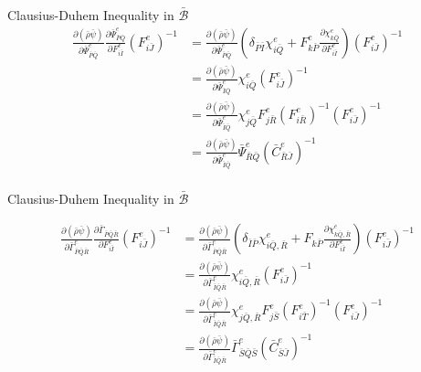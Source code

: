 \documentclass[11pt]{beamer}
\begin{document}
\begin{frame}{Clausius-Duhem Inequality in $\bar{\mathcal{B}}$}
\begin{align*}
\frac{\partial\left(\bar{\rho}\bar{\psi}\right)}{\partial \bar{\Psi}_{\bar{P}\bar{Q}}^e} \frac{\partial \bar{\Psi}_{\bar{P}\bar{Q}}^e}{\partial F_{i\bar{I}}^e} \left(F_{i\bar{J}}^e\right)^{-1} &= \frac{\partial\left(\bar{\rho}\bar{\psi}\right)}{\partial \bar{\Psi}_{\bar{P}\bar{Q}}^e}\left(\delta_{\bar{P}\bar{I}} \chi_{i\bar{Q}}^e + F_{k\bar{P}}^e \frac{\partial \chi_{k\bar{Q}}^e}{\partial F_{i\bar{I}}^e} \right)\left(F_{i\bar{J}}^e\right)^{-1}\\
&= \frac{\partial\left(\bar{\rho}\bar{\psi}\right)}{\partial \bar{\Psi}_{\bar{I}\bar{Q}}^e}\chi_{i\bar{Q}}^e\left(F_{i\bar{J}}^e\right)^{-1}\\& = \frac{\partial\left(\bar{\rho}\bar{\psi}\right)}{\partial \bar{\Psi}_{\bar{I}\bar{Q}}^e}\chi_{j\bar{Q}}^e F_{j\bar{R}}^e \left(F_{i\bar{R}}^e\right)^{-1} \left(F_{i\bar{J}}^e\right)^{-1}\\
&=  \frac{\partial\left(\bar{\rho}\bar{\psi}\right)}{\partial \bar{\Psi}_{\bar{I}\bar{Q}}^e}\bar{\Psi}_{\bar{R}\bar{Q}}^e \left(\bar{C}_{\bar{R}\bar{J}}^e\right)^{-1}\\
\end{align*}

\end{frame}

\begin{frame}{Clausius-Duhem Inequality in $\bar{\mathcal{B}}$}

\begin{align*}
\frac{\partial\left(\bar{\rho}\bar{\psi}\right)}{\partial \bar{\Gamma}_{\bar{P}\bar{Q}\bar{R}}^e} \frac{\partial \bar{\Gamma}_{\bar{P}\bar{Q}\bar{R}}}{\partial F_{i\bar{I}}^e}\left(F_{i\bar{J}}^e\right)^{-1} &= \frac{\partial\left(\bar{\rho}\bar{\psi}\right)}{\partial \bar{\Gamma}_{\bar{P}\bar{Q}\bar{R}}^e}\left(\delta_{\bar{I}\bar{P}} \chi_{i\bar{Q},\bar{R}}^e + F_{k\bar{P}} \frac{\partial \chi_{k\bar{Q},\bar{R}}^e}{\partial F_{i\bar{I}}^e}\right)\left(F_{i\bar{J}}^e\right)^{-1}\\
&= \frac{\partial\left(\bar{\rho}\bar{\psi}\right)}{\partial \bar{\Gamma}_{\bar{I}\bar{Q}\bar{R}}^e} \chi_{i\bar{Q},\bar{R}}^e \left(F_{i\bar{J}}^e\right)^{-1}\\
&= \frac{\partial\left(\bar{\rho}\bar{\psi}\right)}{\partial \bar{\Gamma}_{\bar{I}\bar{Q}\bar{R}}^e} \chi_{j\bar{Q},\bar{R}}^e F_{j\bar{S}}^e \left(F_{i\bar{T}}^e\right)^{-1} \left(F_{i\bar{J}}^e\right)^{-1}\\
&= \frac{\partial\left(\bar{\rho}\bar{\psi}\right)}{\partial \bar{\Gamma}_{\bar{I}\bar{Q}\bar{R}}^e} \bar{\Gamma}_{\bar{S}\bar{Q}\bar{S}}^e \left(\bar{C}_{\bar{S}\bar{J}}^e\right)^{-1}\\
\end{align*}
\end{frame}
\end{document}
